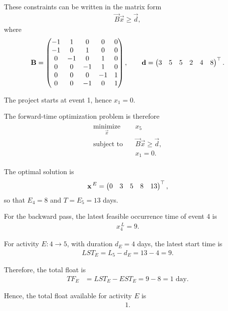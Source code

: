 \begin{enumerate}[label=\thesubsection.\arabic*, ref=\thesubsection.\theenumi,itemsep=0pt]
These constraints can be written in the matrix form
\begin{align}
\vec{B}\vec{x}\ge\vec{d},
\end{align}
where
\begin{align}
\mathbf{B}
=
\begin{pmatrix}
-1&1&0&0&0\\
-1&0&1&0&0\\
0&-1&0&1&0\\
0&0&-1&1&0\\
0&0&0&-1&1\\
0&0&-1&0&1
\end{pmatrix},
\qquad
\mathbf{d}
=
\begin{pmatrix}
3&5&5&2&4&8
\end{pmatrix}^{\top}.
\end{align}

The project starts at event 1, hence $x_1=0$.

The forward-time optimization problem is therefore
\begin{align}
\begin{aligned}
\underset{\vec{x}}{\operatorname{minimize}}\quad
&x_5\\
\text{subject to}\quad
&\vec{B}\vec{x}\ge\vec{d},\\
&x_1=0.
\end{aligned}
\end{align}

The optimal solution is
\begin{align}
\mathbf{x}^{\,E}
=
\begin{pmatrix}
0&3&5&8&13
\end{pmatrix}^{\top},
\end{align}
so that $E_4=8$ and $T=E_5=13$ days.

For the backward pass, the latest feasible occurrence time of event 4 is
\begin{align}
x_4^{\,L}=9.
\end{align}

For activity $E:4\rightarrow5$, with duration $d_E=4$ days,
the latest start time is
\begin{align}
LST_E=L_5-d_E=13-4=9.
\end{align}

Therefore, the total float is
\begin{align}
TF_E
&=LST_E-EST_E=9-8=1\text{ day}.
\end{align}

Hence, the total float available for activity $E$ is
\begin{align}
\boxed{1}.
\end{align}


\end{enumerate}

